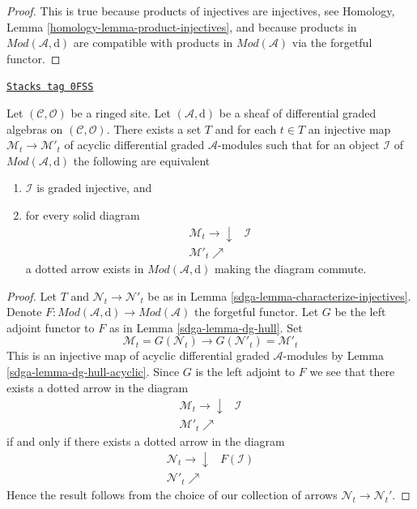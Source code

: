 \begin{proof}
This is true because products of injectives are injectives, see
Homology, Lemma \ref{homology-lemma-product-injectives}, and
because products in
$\textit{Mod}(\mathcal{A}, \text{d})$ are compatible with
products in $\textit{Mod}(\mathcal{A})$ via the forgetful functor.
\end{proof}

\begin{lemma}
\label{sdga-lemma-characterize-graded-injectives-in-dg}
\href{https://stacks.math.columbia.edu/tag/0FSS}{\texttt{Stacks tag 0FSS}}

Let $(\mathcal{C}, \mathcal{O})$ be a ringed site.
Let $(\mathcal{A}, \text{d})$
be a sheaf of differential graded algebras on $(\mathcal{C}, \mathcal{O})$.
There exists a set $T$ and for each $t \in T$ an injective map
$\mathcal{M}_t \to \mathcal{M}'_t$ of
acyclic differential graded $\mathcal{A}$-modules
such that for an object $\mathcal{I}$ of $\textit{Mod}(\mathcal{A}, \text{d})$
the following are equivalent
\begin{enumerate}
\item $\mathcal{I}$ is graded injective, and
\item for every solid diagram
$$
\begin{array}{cc}\mathcal{M}_t \longrightarrow\downarrow & \mathcal{I} \\ \mathcal{M}'_t \nearrow & \end{array}
$$
a dotted arrow exists in $\textit{Mod}(\mathcal{A}, \text{d})$
making the diagram commute.
\end{enumerate}
\end{lemma}

\begin{proof}

Let $T$ and $\mathcal{N}_t \to \mathcal{N}'_t$ be as in
Lemma \ref{sdga-lemma-characterize-injectives}.
Denote $F : \textit{Mod}(\mathcal{A}, \text{d}) \to \textit{Mod}(\mathcal{A})$
the forgetful functor.
Let $G$ be the left adjoint functor to
$F$ as in Lemma \ref{sdga-lemma-dg-hull}. Set
$$
\mathcal{M}_t = G(\mathcal{N}_t) \to
G(\mathcal{N}'_t) = \mathcal{M}'_t
$$
This is an injective map of acyclic differential graded
$\mathcal{A}$-modules by Lemma \ref{sdga-lemma-dg-hull-acyclic}.
Since $G$ is the left adjoint to $F$ we see that
there exists a dotted arrow in the diagram
$$
\begin{array}{cc}\mathcal{M}_t \longrightarrow\downarrow & \mathcal{I} \\ \mathcal{M}'_t \nearrow & \end{array}
$$
if and only if there exists a dotted arrow in the diagram
$$
\begin{array}{cc}\mathcal{N}_t \longrightarrow\downarrow & F(\mathcal{I}) \\ \mathcal{N}'_t \nearrow & \end{array}
$$
Hence the result follows from the choice of our
collection of arrows $\mathcal{N}_t \to \mathcal{N}_t'$.
\end{proof}



